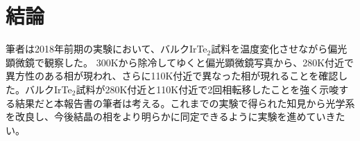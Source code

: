 \section{結論}
筆者は2018年前期の実験において、バルクIrTe$_2$試料を温度変化させながら偏光顕微鏡で観察した。
300Kから除冷してゆくと偏光顕微鏡写真から、280K付近で異方性のある相が現われ、さらに110K付近で異なった相が現れることを確認した。バルクIrTe$_2$試料が280K付近と110K付近で2回相転移したことを強く示唆する結果だと本報告書の筆者は考える。これまでの実験で得られた知見から光学系を改良し、今後結晶の相をより明らかに同定できるように実験を進めていきたい。
